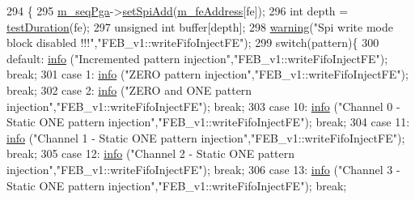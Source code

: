 \begin{DoxyCode}
294                                                   \{
295   \hyperlink{classFEB__v1_a6c7804ac86796f233a8393043adf2e77}{m\_seqPga}->\hyperlink{classSeqPGA_ac998ce3a6d9b5f2e88cc8393f8c1df53}{setSpiAdd}(\hyperlink{classFEB__v1_a4e1945c2d5b434125f375e9d0fc6d99f}{m\_feAddress}[fe]);
296   \textcolor{keywordtype}{int} depth = \hyperlink{classFEB__v1_a7f1db8ca9490172fce7603da9e703dec}{testDuration}(fe);
297   \textcolor{keywordtype}{unsigned} \textcolor{keywordtype}{int} buffer[depth];
298   \hyperlink{classObject_a65cd4fda577711660821fd2cd5a3b4c9}{warning}(\textcolor{stringliteral}{"Spi write mode block disabled !!!"},\textcolor{stringliteral}{"FEB\_v1::writeFifoInjectFE"});        
299   \textcolor{keywordflow}{switch}(pattern)\{
300   \textcolor{keywordflow}{default}: \hyperlink{classObject_a644fd329ea4cb85f54fa6846484b84a8}{info} (\textcolor{stringliteral}{"Incremented pattern injection"},\textcolor{stringliteral}{"FEB\_v1::writeFifoInjectFE"}); \textcolor{keywordflow}{break};
301   \textcolor{keywordflow}{case} 1:  \hyperlink{classObject_a644fd329ea4cb85f54fa6846484b84a8}{info} (\textcolor{stringliteral}{"ZERO pattern injection"},\textcolor{stringliteral}{"FEB\_v1::writeFifoInjectFE"}); \textcolor{keywordflow}{break};
302   \textcolor{keywordflow}{case} 2:  \hyperlink{classObject_a644fd329ea4cb85f54fa6846484b84a8}{info} (\textcolor{stringliteral}{"ZERO and ONE pattern injection"},\textcolor{stringliteral}{"FEB\_v1::writeFifoInjectFE"}); \textcolor{keywordflow}{break};
303   \textcolor{keywordflow}{case} 10:  \hyperlink{classObject_a644fd329ea4cb85f54fa6846484b84a8}{info} (\textcolor{stringliteral}{"Channel 0 - Static ONE pattern injection"},\textcolor{stringliteral}{"FEB\_v1::writeFifoInjectFE"}); \textcolor{keywordflow}{break};
304   \textcolor{keywordflow}{case} 11:  \hyperlink{classObject_a644fd329ea4cb85f54fa6846484b84a8}{info} (\textcolor{stringliteral}{"Channel 1 - Static ONE pattern injection"},\textcolor{stringliteral}{"FEB\_v1::writeFifoInjectFE"}); \textcolor{keywordflow}{break};
305   \textcolor{keywordflow}{case} 12:  \hyperlink{classObject_a644fd329ea4cb85f54fa6846484b84a8}{info} (\textcolor{stringliteral}{"Channel 2 - Static ONE pattern injection"},\textcolor{stringliteral}{"FEB\_v1::writeFifoInjectFE"}); \textcolor{keywordflow}{break};
306   \textcolor{keywordflow}{case} 13:  \hyperlink{classObject_a644fd329ea4cb85f54fa6846484b84a8}{info} (\textcolor{stringliteral}{"Channel 3 - Static ONE pattern injection"},\textcolor{stringliteral}{"FEB\_v1::writeFifoInjectFE"}); \textcolor{keywordflow}{break};

\end{DoxyCode}
